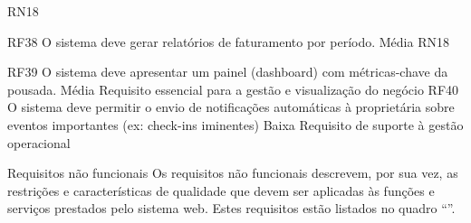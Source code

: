 RN18


RF38
O sistema deve gerar relatórios de faturamento por período.
Média
RN18


RF39
O sistema deve apresentar um painel (dashboard) com métricas-chave da pousada.
Média
Requisito essencial para a gestão e visualização do negócio
RF40
O sistema deve permitir o envio de notificações automáticas à proprietária sobre eventos importantes (ex: check-ins iminentes)
Baixa
Requisito de suporte à gestão operacional
















Requisitos não funcionais 
Os requisitos não funcionais descrevem, por sua vez, as restrições e características de qualidade que devem ser aplicadas às funções e serviços prestados pelo sistema web. Estes requisitos estão listados no quadro “”.


